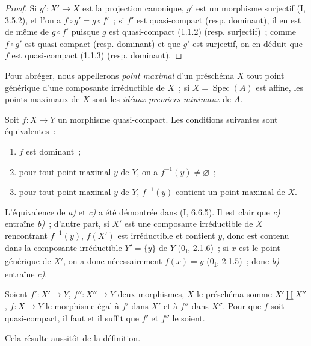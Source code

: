 \begin{proof}
Si $g':X'\to X$ est la projection canonique, $g'$ est un morphisme surjectif
(I, 3.5.2), et l'on a $f\circ g'=g\circ f'$~; si $f'$ est quasi-compact
(resp. dominant), il en est de même de $g\circ f'$ puisque $g$ est
quasi-compact (1.1.2) (resp. surjectif)~; comme $f\circ g'$ est quasi-compact
(resp. dominant) et que $g'$ est surjectif, on en déduit que $f$ est
quasi-compact (1.1.3) (resp. dominant).
\end{proof}


Pour abréger, nous appellerons \emph{point maximal} d'un préschéma $X$ tout
point générique d'une composante irréductible de $X$~; si
$X=\operatorname{Spec}(A)$ est affine, les points maximaux de $X$ sont les
\emph{idéaux premiers minimaux} de $A$.

\begin{proposition}[1.1.5]
\label{IV.1.1.5-fr}
Soit $f:X\to Y$ un morphisme quasi-compact. Les conditions suivantes sont
équivalentes~:
\begin{enumerate}
  \item[a)] $f$ est dominant~;
  \item[b)] pour tout point maximal $y$ de $Y$, on a
  $f^{-1}(y)\neq\varnothing$~;
  \item[c)] pour tout point maximal $y$ de $Y$, $f^{-1}(y)$ contient un point
  maximal de $X$.
\end{enumerate}
\end{proposition}

L'équivalence de \emph{a)} et \emph{c)} a été démontrée dans (I, 6.6.5). Il
est clair que \emph{c)} entraîne \emph{b)}~; d'autre part, si $X'$ est une
composante irréductible de $X$ rencontrant $f^{-1}(y)$, $f(X')$ est
irréductible et contient $y$, donc est contenu dans la composante irréductible
$Y'=\overline{\{y\}}$ de $Y$ (0\textsubscript{I}, 2.1.6)~; si $x$ est le
point générique de $X'$, on a donc nécessairement $f(x)=y$
(0\textsubscript{I}, 2.1.5)~; donc \emph{b)} entraîne \emph{c)}.

\begin{proposition}[1.1.6]
\label{IV.1.1.6-fr}
Soient $f':X'\to Y$, $f'':X''\to Y$ deux morphismes, $X$ le préschéma somme
$X'\coprod X''$, $f:X\to Y$ le morphisme égal à $f'$ dans $X'$ et à $f''$
dans $X''$. Pour que $f$ soit quasi-compact, il faut et il suffit que $f'$ et
$f''$ le soient.
\end{proposition}

Cela résulte aussitôt de la définition.

